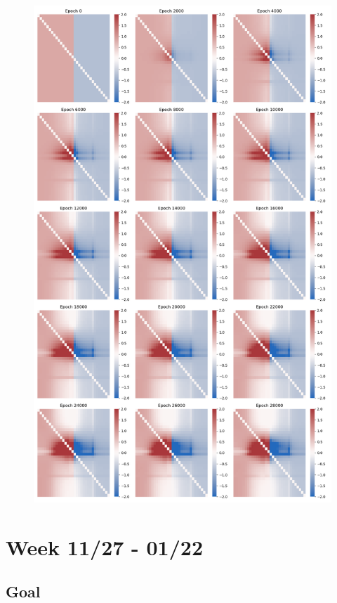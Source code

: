 \documentclass[12pt, a4paper]{article}
\begin{document}
\begin{figure}[H]
    \centering
    \includegraphics[width=\textwidth]{RNN/ourRNN/analysis/fig/0221_SIN2_bphcppt_weight_matrix_overtime.png} 
\end{figure}

\newpage


\section*{Week 11/27 - 01/22}

\subsection*{Goal}
\end{document}
